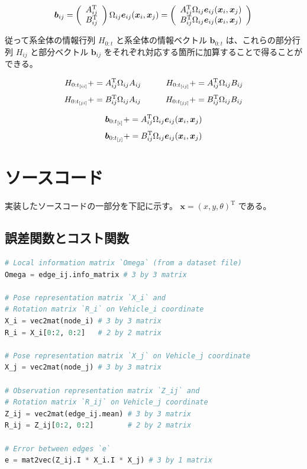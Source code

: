 \documentclass{article}
\begin{document}
\[
\bm{b}_{ij} =
\left(
  \begin{array}{cc}
    A_{ij}^{\mathrm{T}} \\
    B_{ij}^{\mathrm{T}} \\
  \end{array}
\right)
\Omega_{ij}
\bm{e}_{ij}(\bm{x}_i, \bm{x}_j)
=
\left(
  \begin{array}{cc}
    A_{ij}^{\mathrm{T}}\Omega_{ij}\bm{e}_{ij}(\bm{x}_i, \bm{x}_j) \\
    B_{ij}^{\mathrm{T}}\Omega_{ij}\bm{e}_{ij}(\bm{x}_i, \bm{x}_j) \\
  \end{array}
\right) \\
\]

従って系全体の情報行列 $H_{0:t}$ と系全体の情報ベクトル $\bm{b}_{0:t}$ は、これらの部分行列 $H_{ij}$ と部分ベクトル $\bm{b}_{ij}$ をそれぞれ対応する箇所に加算することで得ることができる。

\[
H_{{0:t}_{[ii]}} += A_{ij}^{\mathrm{T}}\Omega_{ij}A_{ij} \hspace{30pt}
H_{{0:t}_{[ij]}} += A_{ij}^{\mathrm{T}}\Omega_{ij}B_{ij} \\
\]
\[
H_{{0:t}_{[ji]}} += B_{ij}^{\mathrm{T}}\Omega_{ij}A_{ij} \hspace{30pt}
H_{{0:t}_{[jj]}} += B_{ij}^{\mathrm{T}}\Omega_{ij}B_{ij} \\
\]

\[
\bm{b}_{{0:t}_{[i]}} += A_{ij}^{\mathrm{T}}\Omega_{ij}\bm{e}_{ij}(\bm{x}_i, \bm{x}_j) \\
\]
\[
\bm{b}_{{0:t}_{[j]}} += B_{ij}^{\mathrm{T}}\Omega_{ij}\bm{e}_{ij}(\bm{x}_i, \bm{x}_j) \\
\]

\newpage

\section{ソースコード}

実装したソースコードの一部分を下記に示す。
$\bm{x} = (x, y, \theta)^{\mathrm{T}}$ である。

\subsection{誤差関数とコスト関数}

\begin{lstlisting}[language=python]
# Local information matrix `Omega` (from a dataset file)
Omega = edge_ij.info_matrix # 3 by 3 matrix

# Pose representation matrix `X_i` and
# Rotation matrix `R_i` on Vehicle_i coordinate
X_i = vec2mat(node_i) # 3 by 3 matrix
R_i = X_i[0:2, 0:2]   # 2 by 2 matrix

# Pose representation matrix `X_j` on Vehicle_j coordinate
X_j = vec2mat(node_j) # 3 by 3 matrix

# Observation representation matrix `Z_ij` and
# Rotation matrix `R_ij` on Vehicle_j coordinate
Z_ij = vec2mat(edge_ij.mean) # 3 by 3 matrix
R_ij = Z_ij[0:2, 0:2]        # 2 by 2 matrix

# Error between edges `e`
e = mat2vec(Z_ij.I * X_i.I * X_j) # 3 by 1 matrix
\end{lstlisting}
\end{document}
